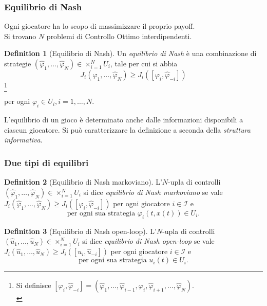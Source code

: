 \documentclass{beamer}
\theoremstyle{plain}
\theoremstyle{definition}
\newtheorem{defn}{Definition}[section]
\newcommand\blfootnote[1]{%
  \begingroup
  \renewcommand\thefootnote{}\footnote{#1}%
  \addtocounter{footnote}{-1}%
  \endgroup
}
\begin{document}
\begin{frame}
\frametitle{Equilibrio di Nash}

Ogni giocatore ha lo scopo di massimizzare il proprio payoff. \\
Si trovano $N$ problemi di Controllo Ottimo interdipendenti. 

\begin{defn}[Equilibrio di Nash]
Un \emph{equilibrio di Nash} è una combinazione di strategie $(\hat{\varphi}_1,\dots,\hat{\varphi}_N) \in \times_{i=1}^N U_i$, tale per cui si abbia
    \[
    J_i(\hat{\varphi}_1,\dots,\hat{\varphi}_N) \ge 
    J_i([\varphi_i,\hat{\varphi}_{-i}])
    \]\blfootnote{Si definisce $[\varphi_i,\hat{\varphi}_{-i}] = (\hat{\varphi}_1,\dots,\hat{\varphi}_{i-1},\varphi_i,\hat{\varphi}_{i+1},\dots,\hat{\varphi}_N)$. \\ \;}
    per ogni $\varphi_i \in U_i, i = 1,\dots,N$.
\end{defn}

L'equilibrio di un gioco è determinato anche dalle informazioni disponibili a ciascun giocatore. Si può caratterizzare la definizione a seconda della \emph{struttura informativa}. 
\end{frame}

\begin{frame}
\frametitle{Due tipi di equilibri}
\begin{defn}[Equilibrio di Nash markoviano]
L'$N$-upla di controlli $(\hat{\varphi}_1,\dots,\hat{\varphi}_N)\in \times_{i=1}^N U_i$ si dice \emph{equilibrio di Nash markoviano} se vale $J_i(\hat{\varphi}_1,\dots,\hat{\varphi}_N) \ge J_i([\varphi_i,\hat{\varphi}_{-i}])$ per ogni giocatore $i \in \mathcal{I}$ e 
    \[
    \text{per ogni sua strategia } \varphi_i(t,x(t)) \in U_i.
    \]
\end{defn}
\begin{defn}[Equilibrio di Nash open-loop]
L'$N$-upla di controlli $(\hat{u}_1,\dots,\hat{u}_N) \in \times_{i=1}^N U_i$ si dice \emph{equilibrio di Nash open-loop} se vale $J_i(\hat{u}_1,\dots,\hat{u}_N) \ge J_i([u_i,\hat{u}_{-i}])$ per ogni giocatore $i \in \mathcal{I}$ e 
    \[
    \text{per ogni sua strategia } u_i(t) \in U_i. 
    \]
\end{defn}
\end{frame}
\end{document}
